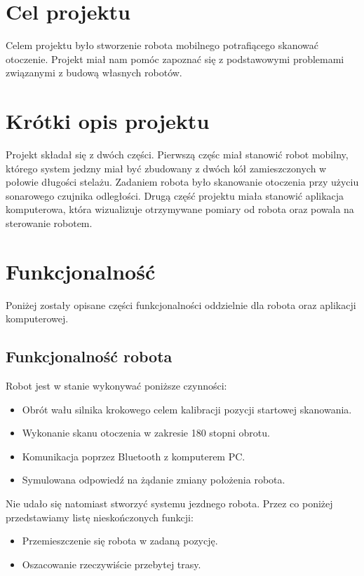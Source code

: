 \documentclass[a4paper]{article}
\begin{document}

\newpage

\tableofcontents
\listoffigures

\newpage

\section{Cel projektu}
Celem projektu było stworzenie robota mobilnego potrafiącego skanować otoczenie. Projekt miał nam pomóc zapoznać się z podstawowymi problemami związanymi z budową własnych robotów. 

\section{Krótki opis projektu}
Projekt składał się z dwóch części. Pierwszą częśc miał stanowić robot mobilny, którego system jedzny miał być zbudowany z dwóch kół zamieszczonych w połowie długości stelażu. Zadaniem robota było skanowanie otoczenia przy użyciu sonarowego czujnika odległości. \newline
Drugą część projektu miała stanowić aplikacja komputerowa, która wizualizuje otrzymywane pomiary od robota oraz powala na sterowanie robotem. 

\section{Funkcjonalność}
Poniżej zostały opisane części funkcjonalności oddzielnie dla robota oraz aplikacji komputerowej.
\subsection{Funkcjonalność robota}
Robot jest w stanie wykonywać poniższe czynności:
\begin{itemize}
\item Obrót wału silnika krokowego celem kalibracji pozycji startowej skanowania.
\item Wykonanie skanu otoczenia w zakresie 180 stopni obrotu. 
\item Komunikacja poprzez Bluetooth z komputerem PC.
\item Symulowana odpowiedź na żądanie zmiany położenia robota.
\end{itemize}
Nie udało się natomiast stworzyć systemu jezdnego robota. Przez co poniżej przedstawiamy listę nieskończonych funkcji:
\begin{itemize}
\item Przemieszczenie się robota w zadaną pozycję.
\item Oszacowanie rzeczywiście przebytej trasy.
\end{itemize}
\end{document}
